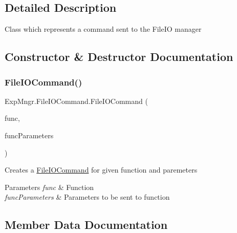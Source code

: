 \subsection{Detailed Description}
Class which represents a command sent to the File\+IO manager 



\subsection{Constructor \& Destructor Documentation}
\mbox{\label{class_exp_mngr_1_1_file_i_o_command_aaa09bec6e574f13260c0a057cc1d8719}} 
\subsubsection{\texorpdfstring{File\+I\+O\+Command()}{FileIOCommand()}}
{\footnotesize\ttfamily Exp\+Mngr.\+File\+I\+O\+Command.\+File\+I\+O\+Command (\begin{DoxyParamCaption}\item[{\hyperlink{namespace_exp_mngr_ada658a3bceadc7d2f4be3a749edae819}{File\+I\+O\+Function}}]{func,  }\item[{params object \mbox{[}$\,$\mbox{]}}]{func\+Parameters }\end{DoxyParamCaption})}



Creates a \hyperlink{class_exp_mngr_1_1_file_i_o_command}{File\+I\+O\+Command} for given function and paremeters 


\begin{DoxyParams}{Parameters}
{\em func} & Function\\
\hline
{\em func\+Parameters} & Parameters to be sent to function\\
\hline
\end{DoxyParams}


\subsection{Member Data Documentation}
\mbox{\label{class_exp_mngr_1_1_file_i_o_command_a664c3017f124453d6a73feae24459401}} 
